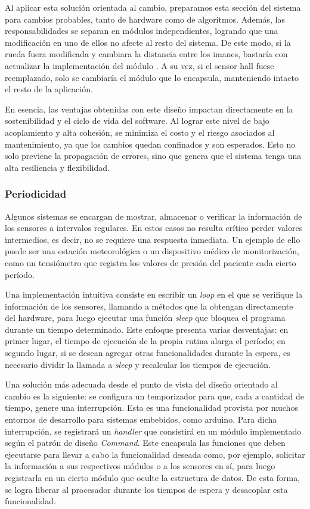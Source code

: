 Al aplicar esta solución orientada al cambio, preparamos esta sección del sistema para cambios probables, tanto de hardware como de algoritmos. Además, las responsabilidades se separan en módulos independientes, logrando que una modificación en uno de ellos no afecte al resto del sistema. De este modo, si la rueda fuera modificada y cambiara la distancia entre los imanes, bastaría con actualizar la implementación del módulo \SensorVelocidad. A su vez, si el sensor \gls{hall} fuese reemplazado, solo se cambiaría el módulo que lo encapsula, manteniendo intacto el resto de la aplicación.

En esencia, las ventajas obtenidas con este diseño impactan directamente en la sostenibilidad y el ciclo de vida del software. Al lograr este nivel de bajo acoplamiento y alta cohesión, se minimiza el costo y el riesgo asociados al mantenimiento, ya que los cambios quedan confinados y son esperados. Esto no solo previene la propagación de errores, sino que genera que el sistema tenga una alta resiliencia y flexibilidad.


\subsubsection*{Periodicidad}

Algunos sistemas se encargan de mostrar, almacenar o verificar la información de los sensores a intervalos regulares. En estos casos no resulta crítico perder valores intermedios, es decir, no se requiere una respuesta inmediata. Un ejemplo de ello puede ser una estación meteorológica o un dispositivo médico de monitorización, como un tensiómetro que registra los valores de presión del paciente cada cierto período.

Una implementación intuitiva consiste en escribir un \textit{loop} en el que se verifique la información de los sensores, llamando a métodos que la obtengan directamente del hardware, para luego ejecutar una función \textit{sleep} que bloquea el programa durante un tiempo determinado. Este enfoque presenta varias desventajas: en primer lugar, el tiempo de ejecución de la propia rutina alarga el período; en segundo lugar, si se desean agregar otras funcionalidades durante la espera, es necesario dividir la llamada a \textit{sleep} y recalcular los tiempos de ejecución.

Una solución más adecuada desde el punto de vista del diseño orientado al cambio es la siguiente: se configura un temporizador para que, cada \textit{x} cantidad de tiempo, genere una interrupción. Esta es una funcionalidad provista por muchos entornos de desarrollo para sistemas embebidos, como \gls{arduino}.
Para dicha interrupción, se registrará un \textit{handler} que consistirá en un módulo implementado según el patrón de diseño \textit{Command}. Este encapsula las funciones que deben ejecutarse para llevar a cabo la funcionalidad deseada como, por ejemplo, solicitar la información a sus respectivos módulos \Computador o a los sensores en sí, para luego registrarla en un cierto módulo que oculte la estructura de datos. De esta forma, se logra liberar al procesador durante los tiempos de espera y desacoplar esta funcionalidad.


